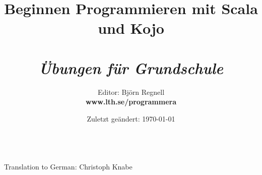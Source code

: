 \documentclass[12pt]{book}
\title{\fontsize{36}{36}\bf\sffamily\selectfont Beginnen Programmieren mit Scala und Kojo \\~\\
\fontsize{26}{26}\it\sffamily\selectfont Übungen für Grundschule  }
\author{Editor: Björn Regnell \\ \bf www.lth.se/programmera}
\date{Zuletzt geändert: \today{ }}
\begin{document}
\maketitle
\newpage
\thispagestyle{empty}

 \\
Translation to German: Christoph Knabe
\newpage
\begin{multicols}{4}
\tableofcontents
\mainmatter
\end{multicols}

\fontsize{20}{22}\selectfont\raggedright


\end{document}
